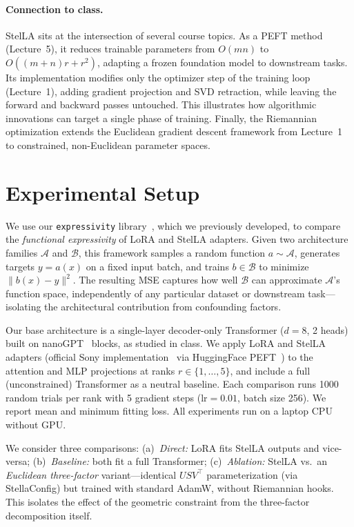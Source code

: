 \documentclass[11pt, a4paper]{article}
\begin{document}
\paragraph{Connection to class.} StelLA sits at the intersection of several course topics. As a PEFT method (Lecture~5), it reduces trainable parameters from $O(mn)$ to $O((m+n)r + r^2)$, adapting a frozen foundation model to downstream tasks. Its implementation modifies only the optimizer step of the training loop (Lecture~1), adding gradient projection and SVD retraction, while leaving the forward and backward passes untouched. This illustrates how algorithmic innovations can target a single phase of training. Finally, the Riemannian optimization extends the Euclidean gradient descent framework from Lecture~1 to constrained, non-Euclidean parameter spaces.

\section{Experimental Setup}

We use our \texttt{expressivity} library~\cite{expressivity}, which we previously developed, to compare the \emph{functional expressivity} of LoRA and StelLA adapters. Given two architecture families $\mathcal{A}$ and $\mathcal{B}$, this framework samples a random function $a \sim \mathcal{A}$, generates targets $y = a(x)$ on a fixed input batch, and trains $b \in \mathcal{B}$ to minimize $\|b(x) - y\|^2$. The resulting MSE captures how well $\mathcal{B}$ can approximate $\mathcal{A}$'s function space, independently of any particular dataset or downstream task---isolating the architectural contribution from confounding factors.

Our base architecture is a single-layer decoder-only Transformer ($d{=}8$, 2 heads) built on nanoGPT~\cite{nanogpt} blocks, as studied in class. We apply LoRA and StelLA adapters (official Sony implementation~\cite{stella_code} via HuggingFace PEFT~\cite{peft}) to the attention and MLP projections at ranks $r \in \{1, \ldots, 5\}$, and include a full (unconstrained) Transformer as a neutral baseline. Each comparison runs 1000 random trials per rank with 5 gradient steps (lr${}=0.01$, batch size 256). We report mean and minimum fitting loss. All experiments run on a laptop CPU without GPU.

We consider three comparisons: (a)~\emph{Direct:} LoRA fits StelLA outputs and vice-versa; (b)~\emph{Baseline:} both fit a full Transformer; (c)~\emph{Ablation:} StelLA vs.\ an \emph{Euclidean three-factor} variant---identical $USV^\top$ parameterization (via StellaConfig) but trained with standard AdamW, without Riemannian hooks. This isolates the effect of the geometric constraint from the three-factor decomposition itself.
\end{document}
